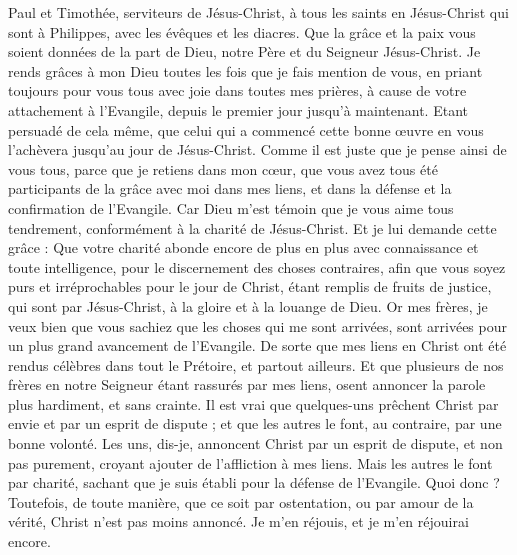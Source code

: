 \begin{multicols}{2}
\VerseOne{}Paul et Timothée, serviteurs de Jésus-Christ, à tous les saints en Jésus-Christ qui sont à Philippes, avec les évêques et les diacres.
Que la grâce et la paix vous soient données de la part de Dieu, notre Père et du Seigneur Jésus-Christ.
Je rends grâces à mon Dieu toutes les fois que je fais mention de vous,
en priant toujours pour vous tous avec joie dans toutes mes prières,
à cause de votre attachement à l'Evangile, depuis le premier jour jusqu'à maintenant.
Etant persuadé de cela même, que celui qui a commencé cette bonne œuvre en vous l'achèvera jusqu'au jour de Jésus-Christ.
Comme il est juste que je pense ainsi de vous tous, parce que je retiens dans mon cœur, que vous avez tous été participants de la grâce avec moi dans mes liens, et dans la défense et la confirmation de l'Evangile.
Car Dieu m'est témoin que je vous aime tous tendrement, conformément à la charité de Jésus-Christ.
Et je lui demande cette grâce : Que votre charité abonde encore de plus en plus avec connaissance et toute intelligence,
pour le discernement des choses contraires, afin que vous soyez purs et irréprochables pour le jour de Christ,
étant remplis de fruits de justice, qui sont par Jésus-Christ, à la gloire et à la louange de Dieu.
Or mes frères, je veux bien que vous sachiez que les choses qui me sont arrivées, sont arrivées pour un plus grand avancement de l'Evangile.
De sorte que mes liens en Christ ont été rendus célèbres dans tout le Prétoire, et partout ailleurs. 
Et que plusieurs de nos frères en notre Seigneur étant rassurés par mes liens, osent annoncer la parole plus hardiment, et sans crainte. 
Il est vrai que quelques-uns prêchent Christ par envie et par un esprit de dispute ; et que les autres le font, au contraire, par une bonne volonté. 
Les uns, dis-je, annoncent Christ par un esprit de dispute, et non pas purement, croyant ajouter de l'affliction à mes liens.
Mais les autres le font par charité, sachant que je suis établi pour la défense de l'Evangile.
Quoi donc ? Toutefois, de toute manière, que ce soit par ostentation, ou par amour de la vérité, Christ n'est pas moins annoncé. Je m'en réjouis, et je m'en réjouirai encore.

\end{multicols}
